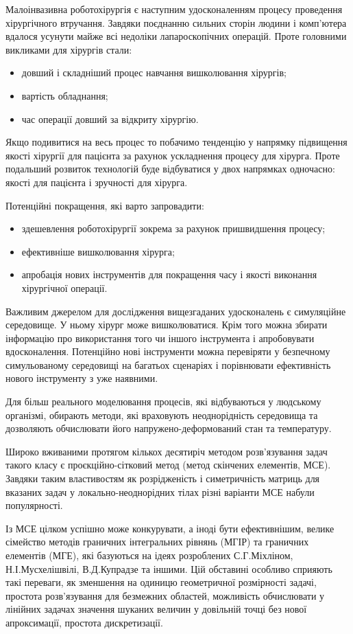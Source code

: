 Малоінвазивна роботохірургія є наступним удосконаленням процесу проведення хірургічного втручання. Завдяки поєднанню
сильних сторін людини і комп'ютера вдалося усунути майже всі недоліки лапароскопічних операцій. Проте головними
викликами для хірургів стали:
\begin{itemize}
  \item довший і складніший процес навчання вишколювання хірургів;
  \item вартість обладнання;
  \item час операції довший за відкриту хірургію.
\end{itemize}

Якщо подивитися на весь процес то побачимо тенденцію у напрямку підвищення якості хірургії для пацієнта за рахунок 
ускладнення процесу для хірурга. Проте подальший розвиток технологій буде відбуватися у двох напрямках одночасно: якості
для пацієнта і зручності для хірурга.

Потенційні покращення, які варто запровадити: 
\begin{itemize}
  \item здешевлення роботохірургії зокрема за рахунок пришвидшення процесу;
  \item ефективніше вишколювання хірурга;
  \item апробація нових інструментів для покращення часу і якості виконання хірургічної операції.
\end{itemize}

Важливим джерелом для дослідження вищезгаданих удосконалень є симуляційне середовище. У ньому хірург може вишколюватися.
Крім того можна збирати інформацію про використання того чи іншого інструмента і апробовувати вдосконалення. Потенційно
нові інструменти можна перевіряти у безпечному симульованому середовищі на багатьох сценаріях і порівнювати ефективність
нового інструменту з уже наявними.

Для більш реального моделювання процесів, які відбуваються у людському організмі, обирають методи, які враховують
неоднорідність середовища та дозволяють обчислювати його напружено-деформований стан та температуру.

Широко вживаними протягом кількох десятиріч методом розв'язування задач такого класу є проєкційно-сітковий
метод (метод скінчених елементів, МСЕ). Завдяки таким властивостям як розрідженість і симетричність матриць для вказаних
задач у локально-неоднорідних тілах різні варіанти МСЕ набули популярності.

Із МСЕ цілком успішно може конкурувати, а іноді бути ефективнішим, велике сімейство методів граничних інтегральних
рівнянь (МГІР) та граничних елементів (МГЕ), які базуються на ідеях розроблених С.Г.Міхліном, Н.І.Мусхелішвілі,
В.Д.Купрадзе та іншими. Цій обставині особливо сприяють такі переваги, як зменшення на одиницю геометричної розмірності
задачі, простота розв'язування для безмежних областей, можливість обчислювати у лінійних задачах значення шуканих
величин у довільній точці без нової апроксимації, простота дискретизації.

